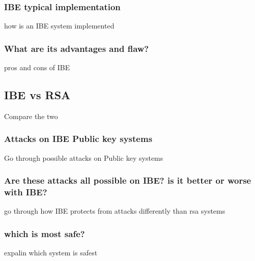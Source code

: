 \documentclass[conference]{IEEEtran}
\begin{document}
\subsubsection{IBE typical implementation}
how is an IBE system implemented

\subsubsection{What are its advantages and flaw?}
pros and cons of IBE

\subsection{IBE vs RSA}
Compare the two

\subsubsection{Attacks on IBE Public key systems}
Go through possible attacks on Public key systems

\subsubsection{Are these attacks all possible on IBE? is it better or worse with IBE?}
go through how IBE protects from attacks differently than rsa systems

\subsubsection{which is most safe?}
expalin which system is safest


%
%
\end{document}
